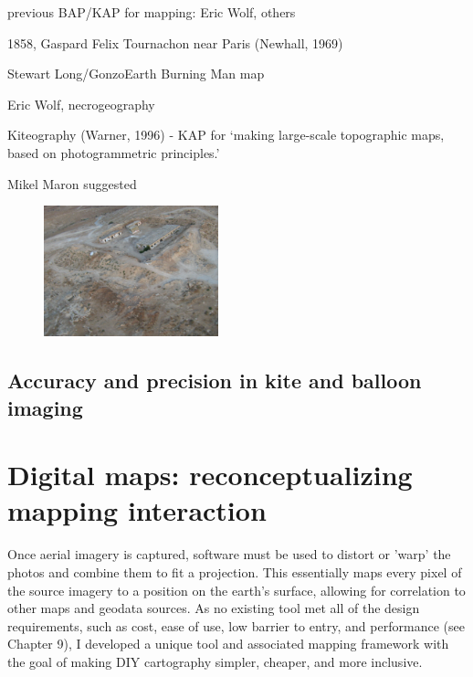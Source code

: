 \documentclass[11pt]{report}
\begin{document}
previous BAP/KAP for mapping: Eric Wolf, others

1858, Gaspard Felix Tournachon near Paris (Newhall, 1969) \cite{vierling2006short}

Stewart Long/GonzoEarth Burning Man map

Eric Wolf, necrogeography

Kiteography (Warner, 1996) - KAP for `making large-scale topographic maps, based on photogrammetric principles.' \cite{vierling2006short}

Mikel Maron suggested



\begin{figure}
	\begin{flushright}
		\includegraphics[width=0.45\textwidth]{images/maron-spy-satellite.jpg}
		\cite{maron2008former}
	\end{flushright}
\end{figure}

\subsection{Accuracy and precision in kite and balloon imaging}


\section{Digital maps: reconceptualizing mapping interaction}

Once aerial imagery is captured, software must be used to distort or 'warp' the photos and combine them to fit a projection. This essentially maps every pixel of the source imagery to a position on the earth's surface, allowing for correlation to other maps and geodata sources. As no existing tool met all of the design requirements, such as cost, ease of use, low barrier to entry, and performance (see Chapter 9), I developed a unique tool and associated mapping framework with the goal of making DIY cartography simpler, cheaper, and more inclusive.
\end{document}
